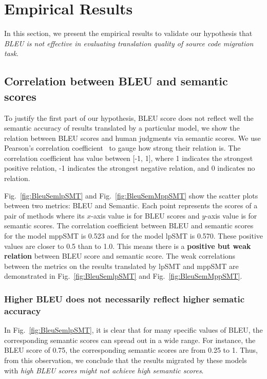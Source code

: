 \section{Empirical Results}
\label{sec:bleuresult}

In this section, we present the empirical results to validate our hypothesis that
\textit{BLEU is not effective in evaluating translation quality of source code migration task}.
\subsection{Correlation between BLEU and semantic scores}
To justify the first part of our hypothesis, BLEU score does not reflect well
the semantic accuracy of results translated by a particular model,
we show the relation between BLEU scores and human judgments via semantic scores.
We use Pearson's correlation coefficient~\cite{geek_2015} to gauge
how strong their relation is. The correlation coefficient has value
between [-1, 1], where 1 indicates the strongest positive relation, -1
indicates the strongest negative relation, and 0 indicates no relation.

Fig.~\ref{fig:BleuSemlpSMT} and Fig.~\ref{fig:BleuSemMppSMT} show the
scatter plots between two metrics: BLEU and Semantic. Each point
represents the scores of a pair of methods where its $x$-axis value is
for BLEU scores and $y$-axis value is for semantic scores. The
correlation coefficient between BLEU and semantic scores for the model
mppSMT is 0.523 and for the model lpSMT is 0.570. These positive values
are closer to 0.5 than to 1.0. This means there is a {\bf positive but weak
relation} between BLEU score and semantic score. The weak correlations %
between the metrics on the results translated by lpSMT and mppSMT are
demonstrated in Fig.~\ref{fig:BleuSemlpSMT} and Fig.~\ref{fig:BleuSemMppSMT}.



\subsubsection{{\bf Higher BLEU does not necessarily reflect higher
sematic accuracy}}

In Fig.~\ref{fig:BleuSemlpSMT}, it is clear that for many specific
values of BLEU, the corresponding semantic scores can spread out in a
wide range. For instance, the BLEU score of 0.75, the corresponding
semantic scores are from 0.25 to 1.
Thus, from this observation, we conclude that the results migrated by
these models with {\em high BLEU scores might not achieve high semantic
scores}.
%

